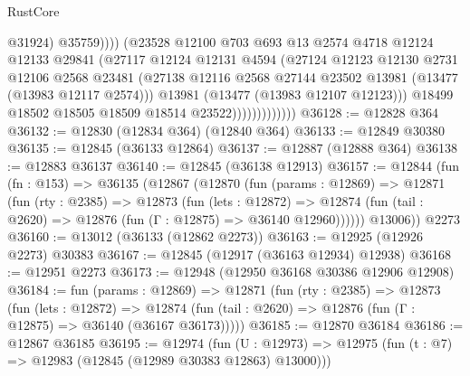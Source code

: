 \begin{lexlean}{RustCore}
\begin{coremodule}
                                    @31924)
                                  @35759))))
                          (@23528
                            @12100
                            @703
                            @693
                            @13
                            @2574
                            @4718
                            @12124
                            @12133
                            @29841
                            (@27117
                              @12124
                              @12131
                              @4594
                              (@27124
                                @12123
                                @12130
                                @2731
                                @12106
                                @2568
                                @23481
                                (@27138
                                  @12116
                                  @2568
                                  @27144
                                  @23502
                                  @13981
                                  (@13477 (@13983 @12117 @2574)))
                                @13981
                                (@13477 (@13983 @12107 @12123)))
                              @18499
                              @18502
                              @18505
                              @18509
                              @18514
                              @23522)))))))))))))
@36128 := @12828 @364
@36132 := @12830 (@12834 @364) (@12840 @364)
@36133 := @12849 @30380
@36135 := @12845 (@36133 @12864)
@36137 := @12887 (@12888 @364)
@36138 := @12883 @36137
@36140 := @12845 (@36138 @12913)
@36157 := @12844
    (fun (fn : @153) =>
    @36135
      (@12867
        (@12870
          (fun (params : @12869) =>
          @12871
            (fun (rty : @2385) =>
            @12873
              (fun (lets : @12872) =>
              @12874 (fun (tail : @2620) => @12876 (fun (Γ : @12875) => @36140 @12960))))))
        @13006))
    @2273
@36160 := @13012 (@36133 (@12862 @2273))
@36163 := @12925 (@12926 @2273) @30383
@36167 := @12845 (@12917 (@36163 @12934) @12938)
@36168 := @12951 @2273
@36173 := @12948 (@12950 @36168 @30386 @12906 @12908)
@36184 := fun (params : @12869) =>
  @12871
    (fun (rty : @2385) =>
    @12873
      (fun (lets : @12872) =>
      @12874 (fun (tail : @2620) => @12876 (fun (Γ : @12875) => @36140 (@36167 @36173)))))
@36185 := @12870 @36184
@36186 := @12867 @36185
@36195 := @12974
    (fun (U : @12973) => @12975 (fun (t : @7) => @12983 (@12845 (@12989 @30383 @12863) @13000)))

\end{coremodule}
\end{lexlean}
